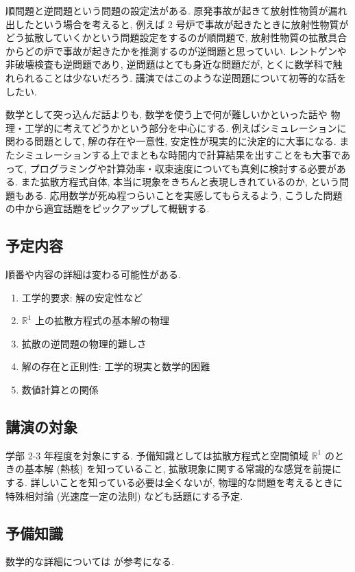 \documentclass[openany, a4paper, oneside]{jsbook}
\begin{document}
順問題と逆問題という問題の設定法がある.
原発事故が起きて放射性物質が漏れ出したという場合を考えると,
例えば 2 号炉で事故が起きたときに放射性物質がどう拡散していくかという問題設定をするのが順問題で,
放射性物質の拡散具合からどの炉で事故が起きたかを推測するのが逆問題と思っていい.
レントゲンや非破壊検査も逆問題であり, 逆問題はとても身近な問題だが,
とくに数学科で触れられることは少ないだろう.
講演ではこのような逆問題について初等的な話をしたい.

数学として突っ込んだ話よりも, 数学を使う上で何が難しいかといった話や
物理・工学的に考えてどうかという部分を中心にする.
例えばシミュレーションに関わる問題として, 解の存在や一意性, 安定性が現実的に決定的に大事になる.
またシミュレーションする上でまともな時間内で計算結果を出すことをも大事であって,
プログラミングや計算効率・収束速度についても真剣に検討する必要がある.
また拡散方程式自体, 本当に現象をきちんと表現しきれているのか, という問題もある.
応用数学が死ぬ程つらいことを実感してもらえるよう,
こうした問題の中から適宜話題をピックアップして概観する.
\subsection{予定内容}

順番や内容の詳細は変わる可能性がある.
\begin{enumerate}
\item 工学的要求: 解の安定性など
\item $\mathbb{R}^1$ 上の拡散方程式の基本解の物理
\item 拡散の逆問題の物理的難しさ
\item 解の存在と正則性: 工学的現実と数学的困難
\item 数値計算との関係
\end{enumerate}
\subsection{講演の対象}

学部 2-3 年程度を対象にする.
予備知識としては拡散方程式と空間領域 $\mathbb{R}^1$ のときの基本解 (熱核) を知っていること,
拡散現象に関する常識的な感覚を前提にする.
詳しいことを知っている必要は全くないが,
物理的な問題を考えるときに特殊相対論 (光速度一定の法則) なども話題にする予定.
\subsection{予備知識}

数学的な詳細については \cite{Kotorin1, KimYamamoto1, NoborizakaOnishiYamamoto1} が参考になる.
\end{document}
